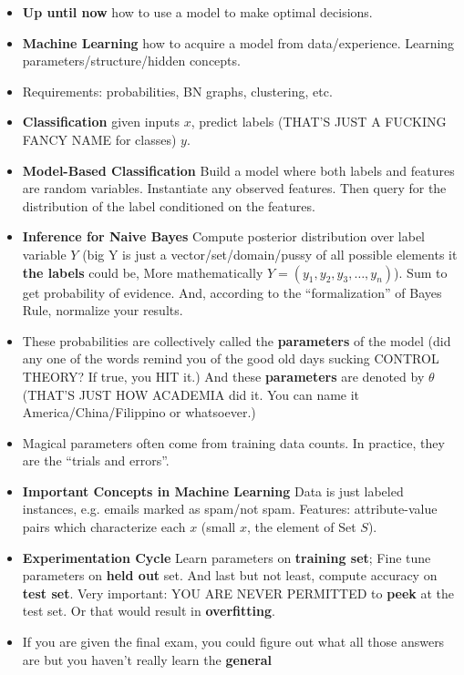 \documentclass[twocolumn]{article}
\begin{document}
\begin{itemize}
\item \textbf{Up until now} how to use a model to make optimal
  decisions. 
\item \textbf{Machine Learning} how to acquire a model from
  data/experience. Learning parameters/structure/hidden concepts.
\item Requirements: probabilities, BN graphs, clustering, etc.
\item \textbf{Classification} given inputs $x$, predict labels (THAT'S
  JUST A FUCKING FANCY NAME for classes) $y$.
\item \textbf{Model-Based Classification} Build a model where both
  labels and features are random variables. Instantiate any observed
  features. Then query for the distribution of the label conditioned
  on the features.
\item \textbf{Inference for Naive Bayes} Compute posterior
  distribution over label variable $Y$ (big Y is just a
  vector/set/domain/pussy of all possible elements it \textbf{the
    labels} could be, More mathematically
  $Y=(y_{1},y_{2},y_{3},\ldots,y_{n})$). Sum to get probability of
  evidence. And, according to the ``formalization'' of Bayes Rule,
  normalize your results.
\item These probabilities are collectively called the
  \textbf{parameters} of the model (did any one of the words remind
  you of the good old days sucking CONTROL THEORY\@? If true, you HIT
  it.) And these \textbf{parameters} are denoted by $\theta$ (THAT'S
  JUST HOW ACADEMIA did it. You can name it America/China/Filippino or
  whatsoever.) 
\item Magical parameters often come from training data counts. In
  practice, they are the ``trials and errors''.
\item \textbf{Important Concepts in Machine Learning} Data is just
  labeled instances, e.g. emails marked as spam/not spam. Features:
  attribute-value pairs which characterize each $x$ (small $x$, the
  element of Set $S$). 
\item \textbf{Experimentation Cycle} Learn parameters on
  \textbf{training set}; Fine tune parameters on \textbf{held out}
  set. And last but not least, compute accuracy on \textbf{test
    set}. Very important: YOU ARE NEVER PERMITTED to \textbf{peek} at
  the test set. Or that would result in \textbf{overfitting}.
\item If you are given the final exam, you could figure out what all
  those answers are but you haven't really learn the \textbf{general
}
\end{itemize}
\end{document}
